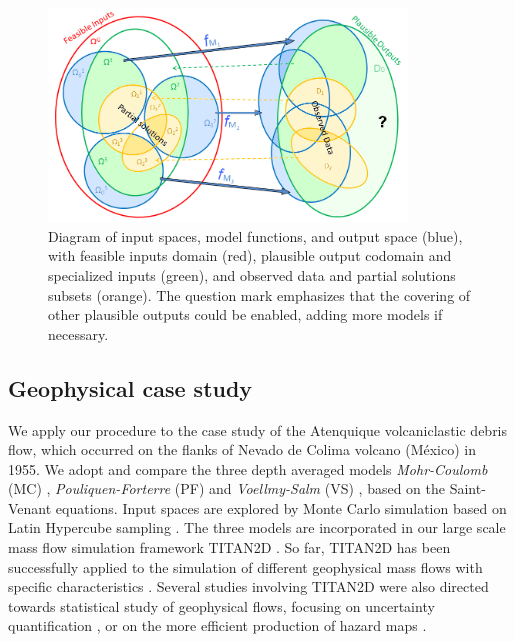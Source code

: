 \documentclass[nhess, manuscript]{copernicus}
\begin{document}
\begin{figure}[H]
\centering
\includegraphics[width=0.85\textwidth]{Scheme_ok3.png}
\caption{Diagram of input spaces, model functions, and output space (blue), with feasible inputs domain (red), plausible output codomain and specialized inputs (green), and observed data and partial solutions subsets (orange). The question mark emphasizes that the covering of other plausible outputs could be enabled, adding more models if necessary.}
\label{scheme}
\end{figure}

\subsection{Geophysical case study}
We apply our procedure to the case study of the Atenquique volcaniclastic debris flow, which occurred on the flanks of Nevado de Colima volcano (M\'exico) in 1955. We adopt and compare the three depth averaged models \emph{Mohr-Coulomb} (MC) \citep{SavageHutter1989}, \emph{Pouliquen-Forterre} (PF) \citep{Pouliquen1999, ForterrePouliquen2002, PouliquenForterre2002} and \emph{Voellmy-Salm} (VS) \citep{Voellmy1955, Salm1990}, based on the Saint-Venant equations. Input spaces are explored by Monte Carlo simulation based on Latin Hypercube sampling \citep{McKay1979,Owen1992b,Stein1987,Ranjan2014,Mingyao2016}. The three models are incorporated in our large scale mass flow simulation framework  TITAN2D \citep{Patra2005,Patra2006,Yu2009,Aghakhani2016,Patra2018}. So far, TITAN2D has been successfully applied to the simulation of different geophysical mass flows with specific characteristics \citep{Sheridan2005, Rupp2006, Norini2008, Charbonnier2009, Procter2010, Sheridan2010, Sulpizio2010, Capra2011}. Several studies involving TITAN2D were also directed towards statistical study of geophysical flows, focusing on uncertainty quantification \citep{Dalbey2008, Dalbey2009, Stefanescu2012b, Stefanescu2012a}, or on the more efficient production of hazard maps \citep{Bayarri2009, Spiller2014, Bayarri2015, Ogburn2016}.
\end{document}

